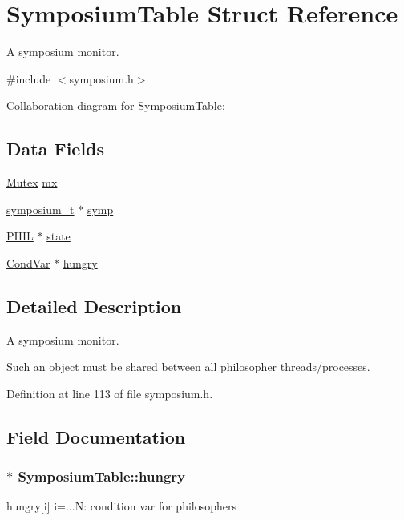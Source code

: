 \hypertarget{structSymposiumTable}{}\section{Symposium\+Table Struct Reference}
\label{structSymposiumTable}


A symposium monitor.  




{\ttfamily \#include $<$symposium.\+h$>$}



Collaboration diagram for Symposium\+Table\+:
\subsection*{Data Fields}
\begin{DoxyCompactItemize}
\item 
\hyperlink{group__syscalls_gaef2ec62cae8e0031fd19fc8b91083ade}{Mutex} \hyperlink{structSymposiumTable_a8c36f26f523e6b2f99f6e70fff098de8}{mx}
\item 
\hyperlink{structsymposium__t}{symposium\+\_\+t} $\ast$ \hyperlink{structSymposiumTable_a4089e2778ba23eb79c4785eb5702f70f}{symp}
\item 
\hyperlink{symposium_8h_a9fced5fb7d50a8fa2e8ae45b0cae3520}{P\+H\+IL} $\ast$ \hyperlink{structSymposiumTable_a70507f28df670d0db2e59fc65309af08}{state}
\item 
\hyperlink{structCondVar}{Cond\+Var} $\ast$ \hyperlink{structSymposiumTable_a6daa1fdbfe8e836e72bfd6953bc91f6e}{hungry}
\end{DoxyCompactItemize}


\subsection{Detailed Description}
A symposium monitor. 

Such an object must be shared between all philosopher threads/processes. 

Definition at line 113 of file symposium.\+h.



\subsection{Field Documentation}
\subsubsection[{\texorpdfstring{hungry}{hungry}}]{$\ast$ Symposium\+Table\+::hungry}\hypertarget{structSymposiumTable_a6daa1fdbfe8e836e72bfd6953bc91f6e}{}\label{structSymposiumTable_a6daa1fdbfe8e836e72bfd6953bc91f6e}
hungry\mbox{[}i\mbox{]} i=...N\+: condition var for philosophers 


